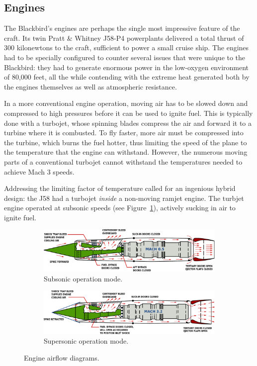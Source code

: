 \documentclass[12pt, draftclsnofoot, onecolumn, doublespaced]{IEEEtran}
\newcommand{\figref}[1]{Figure~\ref{fig:#1}}
\begin{document}
	\subsection{Engines}
	The Blackbird's engines are perhaps the single most impressive feature of the craft. Its twin Pratt \& Whitney J58-P4 powerplants delivered a total thrust of 300 kilonewtons\cite{engines} to the craft, sufficient to power a small cruise ship. The engines had to be specially configured to counter several issues that were unique to the Blackbird: they had to generate enormous power in the low-oxygen environment of 80,000 feet, all the while contending with the extreme heat generated both by the engines themselves as well as atmospheric resistance.
	
	In a more conventional engine operation, moving air has to be slowed down and compressed to high pressures before it can be used to ignite fuel. This is typically done with a turbojet, whose spinning blades compress the air and forward it to a turbine where it is combusted. To fly faster, more air must be compressed into the turbine, which burns the fuel hotter, thus limiting the speed of the plane to the temperature that the engine can withstand. However, the numerous moving parts of a conventional turbojet cannot withstand the temperatures needed to achieve Mach 3 speeds.
	
	 Addressing the limiting factor of temperature called for an ingenious hybrid design: the J58 had a turbojet \emph{inside} a non-moving ramjet engine. The turbjet engine operated at subsonic speeds (see \figref{subsonic}), actively sucking in air to ignite fuel.
	 
	\begin{figure}[h]
	\centering
		\begin{subfigure}{0.8\textwidth}
			\includegraphics[width=\textwidth]{mach05.pdf}
			\caption{Subsonic operation mode.}\label{fig:subsonic}
		\end{subfigure}
		\begin{subfigure}{0.8\textwidth}
			\includegraphics[width=\textwidth]{mach32.pdf}
			\caption{Supersonic operation mode.}\label{fig:supersonic}
		\end{subfigure}
		\caption{Engine airflow diagrams.}
	\end{figure}
	
\end{document}
